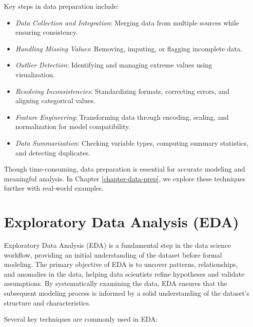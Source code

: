 \documentclass[
  11pt,
]{book}
\providecommand{\tightlist}{%
  \setlength{\itemsep}{0pt}\setlength{\parskip}{0pt}}
\theoremstyle{definition}
\theoremstyle{definition}
\theoremstyle{definition}
\theoremstyle{definition}
\theoremstyle{remark}
\begin{document}
Key steps in data preparation include:

\begin{itemize}
\tightlist
\item
  \emph{Data Collection and Integration}: Merging data from multiple sources while ensuring consistency.\\
\item
  \emph{Handling Missing Values}: Removing, imputing, or flagging incomplete data.\\
\item
  \emph{Outlier Detection}: Identifying and managing extreme values using visualization.\\
\item
  \emph{Resolving Inconsistencies}: Standardizing formats, correcting errors, and aligning categorical values.\\
\item
  \emph{Feature Engineering}: Transforming data through encoding, scaling, and normalization for model compatibility.\\
\item
  \emph{Data Summarization}: Checking variable types, computing summary statistics, and detecting duplicates.
\end{itemize}

Though time-consuming, data preparation is essential for accurate modeling and meaningful analysis. In Chapter \ref{chapter-data-prep}, we explore these techniques further with real-world examples.

\section{Exploratory Data Analysis (EDA)}\label{exploratory-data-analysis-eda}

Exploratory Data Analysis (EDA) is a fundamental step in the data science workflow, providing an initial understanding of the dataset before formal modeling. The primary objective of EDA is to uncover patterns, relationships, and anomalies in the data, helping data scientists refine hypotheses and validate assumptions. By systematically examining the data, EDA ensures that the subsequent modeling process is informed by a solid understanding of the dataset's structure and characteristics.

Several key techniques are commonly used in EDA:
\end{document}
